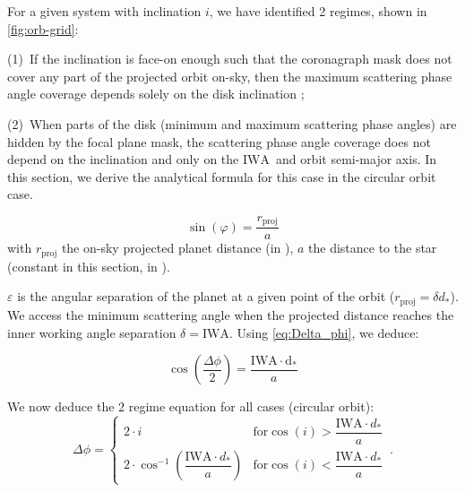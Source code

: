 \documentclass[
    usenatbib,
]{mnras}
\newcommand{\IWA}{\ensuremath{\mathrm{IWA}}}
\begin{document}
For a given system with inclination $i$, we have identified 2 regimes, shown in \cref{fig:orb-grid}:

(1)~If the inclination is face-on enough such that the coronagraph mask does not cover any part of the projected orbit on-sky, then the maximum scattering phase angle coverage depends solely on the disk inclination ;

(2)~When parts of the disk (minimum and maximum scattering phase angles) are hidden by the focal plane mask, the scattering phase angle coverage does not depend on the inclination and only on the \IWA\ and orbit semi-major axis. 
In this section, we derive the analytical formula for this case in the circular orbit case. 

%    

\begin{equation}
    \sin(\varphi) = \frac{r_\mathrm{proj}}{a}
\end{equation}
with $r_\mathrm{proj}$ the on-sky projected planet distance (in \si{\au}), $a$ the distance to the star (constant in this section, in \si{\au}). 

$\varepsilon$ is the angular separation of the planet at a given point of the orbit ($r_\mathrm{proj} = \delta d_*$). 
We access the minimum scattering angle when the projected distance reaches the inner working angle separation $\delta = \mathrm{IWA}$. 
Using \cref{eq:Delta_phi}, we deduce:

\begin{equation}
    \cos\left(\dfrac{\Delta \phi}{2}\right) = \frac{\mathrm{IWA \cdot d_*}}{a}
\end{equation}

We now deduce the 2 regime equation for all cases (circular orbit): 
\begin{equation}
\label{eq:Delta_phi_max}
    \Delta \phi = 
    \begin{cases}
        2 \cdot i & \textrm{for} \cos(i) > \dfrac{\mathrm{IWA}\cdot d_* }{a}
  \\ 
        2 \cdot \cos^{-1}\left(\dfrac{\mathrm{IWA}\cdot d_* }{a}\right)  & \textrm{for} \cos(i) < \dfrac{\mathrm{IWA}\cdot d_* }{a}
    \end{cases}\,.
\end{equation}
\end{document}
